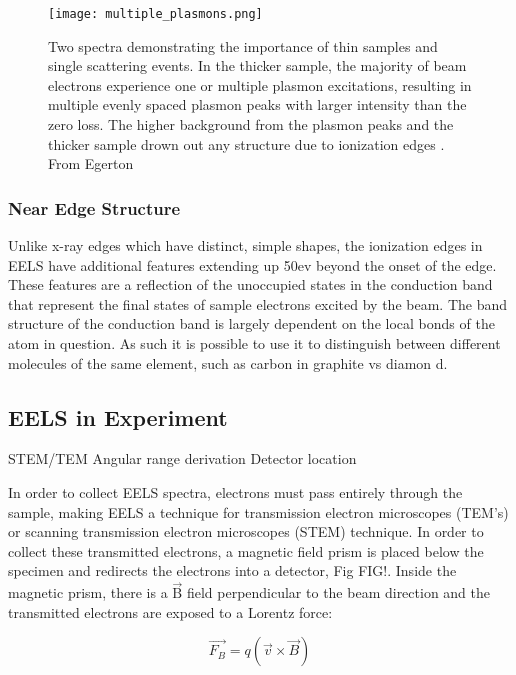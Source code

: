 \begin{figure}
	\centering
	\texttt{[image: multiple\_plasmons.png]}
	\caption{Two spectra demonstrating the importance of thin samples and single scattering events. In the thicker sample, the majority of beam electrons experience one or multiple plasmon excitations, resulting in multiple evenly spaced plasmon peaks with larger intensity than the zero loss.  The higher background from the plasmon peaks and the thicker sample drown out any structure due to ionization edges \cite{Egerton}. From Egerton \cite{Egerton}}
	\label{multiple_plasmons}
\end{figure}



\subsubsection{Near Edge Structure}
Unlike x-ray edges which have distinct, simple shapes, the ionization edges in EELS have additional features extending up 50ev beyond the onset of the edge.   These features are a reflection of the unoccupied states in the conduction band that represent the final states of sample electrons excited by the beam.  The band structure of the conduction band is largely dependent on the local bonds of the atom in question.  As such it is possible to use it to distinguish between different molecules of the same element, such as carbon in graphite vs diamon \cite{hamon_elnes_2004}d.  




\subsection{EELS in Experiment}

STEM/TEM
Angular range derivation
Detector location



In order to collect EELS spectra, electrons must pass entirely through the sample, making EELS a technique for transmission electron microscopes (TEM's) or scanning transmission electron microscopes (STEM) technique.  In order to collect these transmitted electrons, a magnetic field prism is placed below the specimen and redirects the electrons into a detector, Fig FIG!.  Inside the magnetic prism, there is a $\mathrm{\vec{B}}$ field perpendicular to the beam direction and the transmitted electrons are exposed to a Lorentz force: 


\begin{equation}
\vec{F_B} = q (\vec{v} \times \vec{B})
\end{equation}

